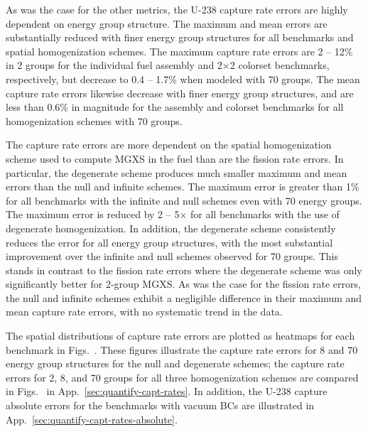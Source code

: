 As was the case for the other metrics, the U-238 capture rate errors are highly dependent on energy group structure. The maximum and mean errors are substantially reduced with finer energy group structures for all benchmarks and spatial homogenization schemes. The maximum capture rate errors are 2 -- 12\% in 2 groups for the individual fuel assembly and 2$\times$2 colorset benchmarks, respectively, but decrease to 0.4 -- 1.7\% when modeled with 70 groups. The mean capture rate errors likewise decrease with finer energy group structures, and are less than 0.6\% in magnitude for the assembly and colorset benchmarks for all homogenization schemes with 70 groups.

The capture rate errors are more dependent on the spatial homogenization scheme used to compute \ac{MGXS} in the fuel than are the fission rate errors. In particular, the degenerate scheme produces much smaller maximum and mean errors than the null and infinite schemes. The maximum error is greater than 1\% for all benchmarks with the infinite and null schemes even with 70 energy groups. The maximum error is reduced by 2 -- 5$\times$ for all benchmarks with the use of degenerate homogenization. In addition, the degenerate scheme consistently reduces the error for all energy group structures, with the most substantial improvement over the infinite and null schemes observed for 70 groups. This stands in contrast to the fission rate errors where the degenerate scheme was only significantly better for 2-group \ac{MGXS}. As was the case for the fission rate errors, the null and infinite schemes exhibit a negligible difference in their maximum and mean capture rate errors, with no systematic trend in the data.

The spatial distributions of capture rate errors are plotted as heatmaps for each benchmark in Figs.~. These figures illustrate the capture rate errors for 8 and 70 energy group structures for the null and degenerate schemes; the capture rate errors for 2, 8, and 70 groups for all three homogenization schemes are compared in Figs.~ in App.~\ref{sec:quantify-capt-rates}. In addition, the U-238 capture absolute errors for the benchmarks with vacuum \acp{BC} are illustrated in App.~\ref{sec:quantify-capt-rates-absolute}.

